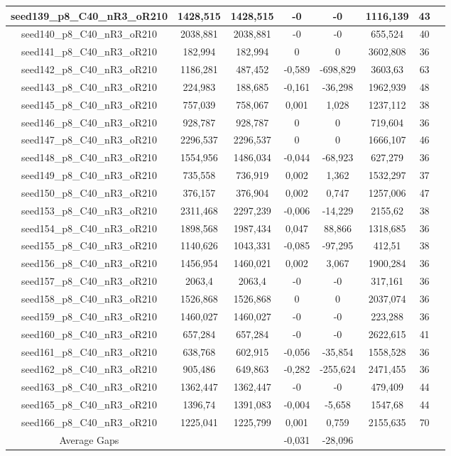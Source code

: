\documentclass[a4paper]{article}
\begin{document}
\begin{center}
\begin{longtable}{cccccccc}
\hline
seed139\_p8\_C40\_nR3\_oR210 & 1428,515 & 1428,515 & -0 & -0 & 1116,139 & 43\\
\hline
seed140\_p8\_C40\_nR3\_oR210 & 2038,881 & 2038,881 & -0 & -0 & 655,524 & 40\\
\hline
seed141\_p8\_C40\_nR3\_oR210 & 182,994 & 182,994 & 0 & 0 & 3602,808 & 36\\
\hline
seed142\_p8\_C40\_nR3\_oR210 & 1186,281 & 487,452 & -0,589 & -698,829 & 3603,63 & 63\\
\hline
seed143\_p8\_C40\_nR3\_oR210 & 224,983 & 188,685 & -0,161 & -36,298 & 1962,939 & 48\\
\hline
seed145\_p8\_C40\_nR3\_oR210 & 757,039 & 758,067 & 0,001 & 1,028 & 1237,112 & 38\\
\hline
seed146\_p8\_C40\_nR3\_oR210 & 928,787 & 928,787 & 0 & 0 & 719,604 & 36\\
\hline
seed147\_p8\_C40\_nR3\_oR210 & 2296,537 & 2296,537 & 0 & 0 & 1666,107 & 46\\
\hline
seed148\_p8\_C40\_nR3\_oR210 & 1554,956 & 1486,034 & -0,044 & -68,923 & 627,279 & 36\\
\hline
seed149\_p8\_C40\_nR3\_oR210 & 735,558 & 736,919 & 0,002 & 1,362 & 1532,297 & 37\\
\hline
seed150\_p8\_C40\_nR3\_oR210 & 376,157 & 376,904 & 0,002 & 0,747 & 1257,006 & 47\\
\hline
seed153\_p8\_C40\_nR3\_oR210 & 2311,468 & 2297,239 & -0,006 & -14,229 & 2155,62 & 38\\
\hline
seed154\_p8\_C40\_nR3\_oR210 & 1898,568 & 1987,434 & 0,047 & 88,866 & 1318,685 & 36\\
\hline
seed155\_p8\_C40\_nR3\_oR210 & 1140,626 & 1043,331 & -0,085 & -97,295 & 412,51 & 38\\
\hline
seed156\_p8\_C40\_nR3\_oR210 & 1456,954 & 1460,021 & 0,002 & 3,067 & 1900,284 & 36\\
\hline
seed157\_p8\_C40\_nR3\_oR210 & 2063,4 & 2063,4 & -0 & -0 & 317,161 & 36\\
\hline
seed158\_p8\_C40\_nR3\_oR210 & 1526,868 & 1526,868 & 0 & 0 & 2037,074 & 36\\
\hline
seed159\_p8\_C40\_nR3\_oR210 & 1460,027 & 1460,027 & -0 & -0 & 223,288 & 36\\
\hline
seed160\_p8\_C40\_nR3\_oR210 & 657,284 & 657,284 & -0 & -0 & 2622,615 & 41\\
\hline
seed161\_p8\_C40\_nR3\_oR210 & 638,768 & 602,915 & -0,056 & -35,854 & 1558,528 & 36\\
\hline
seed162\_p8\_C40\_nR3\_oR210 & 905,486 & 649,863 & -0,282 & -255,624 & 2471,455 & 36\\
\hline
seed163\_p8\_C40\_nR3\_oR210 & 1362,447 & 1362,447 & -0 & -0 & 479,409 & 44\\
\hline
seed165\_p8\_C40\_nR3\_oR210 & 1396,74 & 1391,083 & -0,004 & -5,658 & 1547,68 & 44\\
\hline
seed166\_p8\_C40\_nR3\_oR210 & 1225,041 & 1225,799 & 0,001 & 0,759 & 2155,635 & 70\\
\hline
\hline
Average Gaps & & & -0,031 & -28,096 & & \\
\hline
\hline
\end{longtable}
\end{center}
\end{document}

